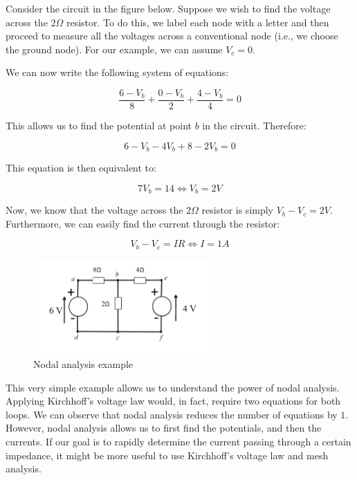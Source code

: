 \documentclass{article}
\begin{document}
\begin{example}

    Consider the circuit in the figure below. Suppose we wish to find the voltage across the $2\Omega$ resistor. To do this, we label each node with a letter and then proceed to measure all the voltages across a conventional node (i.e., we choose the ground node). For our example, we can assume $V_c = 0$.

    We can now write the following system of equations:

    \[ \frac{6 - V_b}{8} + \frac{0 - V_b}{2} + \frac{4 - V_b}{4} = 0 \]

    This allows us to find the potential at point $b$ in the circuit. Therefore:

    \[ 6 - V_b - 4V_b + 8 - 2V_b = 0 \]

    This equation is then equivalent to:

    \[ 7V_b = 14 \iff V_b = 2V \]

    Now, we know that the voltage across the $2\Omega$ resistor is simply $V_b - V_c = 2V$. Furthermore, we can easily find the current through the resistor:

    \[ V_b - V_c = IR \iff I = 1A \]
    
    \begin{figure}[h]
    \centering
    \includegraphics[width=0.6\textwidth]{images/nodal.png}
    \caption{Nodal analysis example}
    \label{fig:nodal-analysis}
    \end{figure}

    This very simple example allows us to understand the power of nodal analysis. Applying Kirchhoff's voltage law would, in fact, require two equations for both loops. We can observe that nodal analysis reduces the number of equations by $1$. However, nodal analysis allows us to first find the potentials, and then the currents. If our goal is to rapidly determine the current passing through a certain impedance, it might be more useful to use Kirchhoff's voltage law and mesh analysis.
\end{example}
\end{document}
